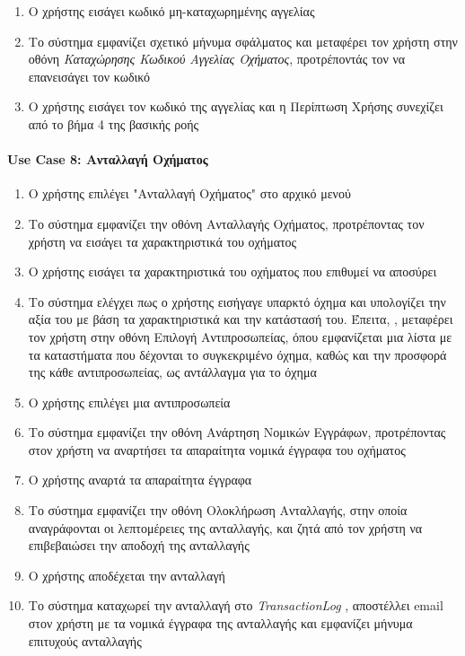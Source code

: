 \documentclass{../ol-softwaremanual}
\begin{document}
	\begin{enumerate}
			\item Ο χρήστης εισάγει κωδικό μη-καταχωρημένης αγγελίας
			\item Το σύστημα εμφανίζει σχετικό μήνυμα σφάλματος και μεταφέρει τον χρήστη στην οθόνη \textit{Καταχώρησης Κωδικού Αγγελίας Οχήματος}, προτρέποντάς τον να επανεισάγει τον κωδικό
			\item Ο χρήστης εισάγει τον κωδικό της αγγελίας και η Περίπτωση Χρήσης συνεχίζει από το βήμα 4 της βασικής ροής
	\end{enumerate}
	
	
	\paragraph{\en Use Case 8: \gr  Ανταλλαγή Οχήματος \gr}
	
	\begin{enumerate}
			\item Ο χρήστης επιλέγει \en"\gr Ανταλλαγή Οχήματος\en" \gr στο αρχικό μενού
			\item Το σύστημα εμφανίζει την οθόνη Ανταλλαγής Οχήματος, προτρέποντας τον χρήστη να εισάγει τα χαρακτηριστικά του οχήματος 
			\item Ο χρήστης εισάγει τα χαρακτηριστικά του οχήματος που επιθυμεί να αποσύρει
			\item Το σύστημα ελέγχει πως ο χρήστης εισήγαγε υπαρκτό όχημα και υπολογίζει την αξία του με βάση τα χαρακτηριστικά και την κατάστασή του. Έπειτα, ,  μεταφέρει τον χρήστη στην οθόνη Επιλογή Αντιπροσωπείας, όπου εμφανίζεται μια λίστα με τα καταστήματα που δέχονται το συγκεκριμένο όχημα, καθώς και την προσφορά της κάθε αντιπροσωπείας, ως αντάλλαγμα για το όχημα
			\item Ο χρήστης επιλέγει μια αντιπροσωπεία
			\item Το σύστημα εμφανίζει την οθόνη Ανάρτηση Νομικών Εγγράφων, προτρέποντας στον χρήστη να αναρτήσει τα απαραίτητα νομικά έγγραφα του οχήματος
			\item Ο χρήστης αναρτά τα απαραίτητα έγγραφα		
			\item Το σύστημα εμφανίζει την οθόνη Ολοκλήρωση Ανταλλαγής, στην οποία αναγράφονται οι λεπτομέρειες της ανταλλαγής, και ζητά από τον χρήστη να επιβεβαιώσει την αποδοχή της ανταλλαγής
			\item Ο χρήστης αποδέχεται την ανταλλαγή
			\item Το σύστημα καταχωρεί την ανταλλαγή στο \en \textit{TransactionLog} \gr, αποστέλλει \en email \gr στον χρήστη με τα νομικά έγγραφα της ανταλλαγής και εμφανίζει μήνυμα επιτυχούς ανταλλαγής		
	\end{enumerate}
	
\end{document}
